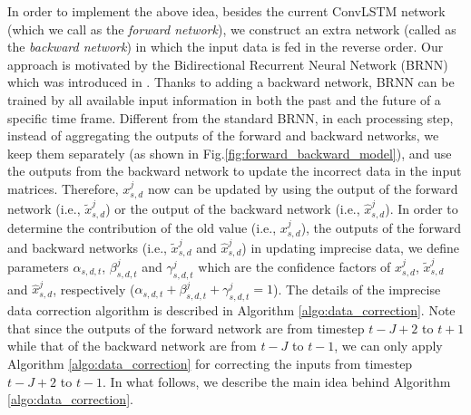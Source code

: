 In order to implement the above idea, besides the current ConvLSTM network (which we call as the \textit{forward network}), we construct an extra network (called as the \textit{backward network}) in which the input data is fed in the reverse order. 
Our approach is motivated by the Bidirectional Recurrent Neural Network (BRNN) which was introduced in \cite{schuster1997bidirectional}. Thanks to adding a backward network, BRNN can be trained by all available input information in both the past and the future of a specific time frame. Different from the standard BRNN, in each processing step, instead of aggregating the outputs of the forward and backward networks, we keep them separately (as shown in Fig.\ref{fig:forward_backward_model}), and use the outputs from the backward network to update the incorrect data in the input matrices. Therefore, $x_{s,d}^j$ now can be updated by using the output of the forward network (i.e., $\widetilde{x}^j_{s,d}$) or the output of the backward network (i.e., $\widehat{x}^j_{s,d}$). 
In order to determine the contribution of the old value (i.e., $x_{s,d}^j$), the outputs of the forward and backward networks (i.e., $\widetilde{x}^j_{s,d}$ and $\widehat{x}^j_{s,d}$) in updating imprecise data, we define parameters $\alpha_{s,d,t}$, $\beta^j_{s,d,t}$ and $\gamma^j_{s,d,t}$ which are the confidence factors of $x_{s,d}^j$, $\widetilde{x}_{s,d}^j$ and $\widehat{x}_{s,d}^j$, respectively ($\alpha_{s,d,t} + \beta^j_{s,d,t} + \gamma^j_{s,d,t} = 1$). The details of the imprecise data correction algorithm is described in Algorithm \ref{algo:data_correction}. Note that since the outputs of the forward network are from timestep $t-J+2$ to $t+1$ while that of the backward network are from $t-J$ to $t-1$, we can only apply Algorithm \ref{algo:data_correction} for correcting the inputs from timestep $t-J+2$ to $t-1$. In what follows, we describe the main idea behind Algorithm \ref{algo:data_correction}. 
